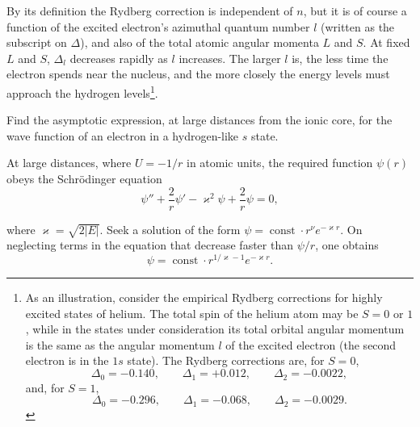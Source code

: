 By its definition the Rydberg correction is independent of $n$, but it is of
course a function of the excited electron's azimuthal quantum number $l$
(written as the subscript on $\Delta$), and also of the total atomic angular
momenta $L$ and $S$. At fixed $L$ and $S$, $\Delta_l$ decreases rapidly as $l$
increases. The larger $l$ is, the less time the electron spends near the
nucleus, and the more closely the energy levels must approach the hydrogen
levels\footnote{As an illustration, consider the empirical Rydberg corrections
for highly excited states of helium. The total spin of the helium atom may be
$S=0$ or $1$, while in the states under consideration its total orbital
angular momentum is the same as the angular momentum $l$ of the excited
electron (the second electron is in the $1s$ state). The Rydberg corrections
are, for $S=0$,
\[
\Delta_0=-0.140,\qquad \Delta_1=+0.012,\qquad \Delta_2=-0.0022,
\]
and, for $S=1$,
\[
\Delta_0=-0.296,\qquad \Delta_1=-0.068,\qquad \Delta_2=-0.0029.
\] }.

\ProblemHeading
Find the asymptotic expression, at large distances from the ionic core, for
the wave function of an electron in a hydrogen-like $s$ state.

\SolutionHeading At large distances, where $U=-1/r$ in atomic units, the
required function $\psi(r)$ obeys the Schrödinger equation
\[
\psi''+\frac2r\psi'-\varkappa^2\psi+\frac2r\psi=0,
\]

where $\varkappa=\sqrt{2|E|}$. Seek a solution of the form
$\psi=\operatorname{const}\cdot r^\nu e^{-\varkappa r}$. On neglecting terms in
the equation that decrease faster than $\psi/r$, one obtains
\[
\psi=\operatorname{const}\cdot r^{1/\varkappa-1}e^{-\varkappa r}.
\]
